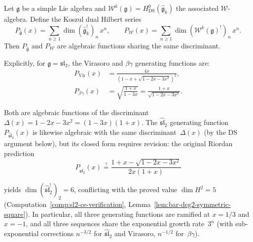 \begin{theorem}
\label{thm:ds-bar-gf-discriminant}
Let $\mathfrak{g}$ be a simple Lie algebra and
$\mathcal{W}^k(\mathfrak{g}) = H^0_{\mathrm{DS}}(\widehat{\mathfrak{g}}_k)$
the associated $\mathcal{W}$-algebra.
Define the Koszul dual Hilbert series
\[
P_{\widehat{\mathfrak{g}}}(x)
  = \sum_{n \geq 1} \dim (\widehat{\mathfrak{g}}_k^!)_n\, x^n,
\qquad
P_{\mathcal{W}}(x)
  = \sum_{n \geq 1} \dim (\mathcal{W}^k(\mathfrak{g})^!)_n\, x^n.
\]
Then $P_{\widehat{\mathfrak{g}}}$ and $P_{\mathcal{W}}$ are algebraic
functions sharing the same discriminant.

Explicitly, for $\mathfrak{g} = \mathfrak{sl}_2$,
the Virasoro and $\beta\gamma$ generating functions are:
\begin{align}
P_{\mathrm{Vir}}(x)
  &= \frac{4x}{(1 - x + \sqrt{1 - 2x - 3x^2})^2},
  \label{eq:gf-vir-motzkin} \\
P_{\beta\gamma}(x)
  &= \sqrt{\frac{1+x}{1-3x}}
  = \frac{1+x}{\sqrt{1-2x-3x^2}}.
  \label{eq:gf-betagamma}
\end{align}

Both are algebraic functions of the discriminant
$\Delta(x) = 1 - 2x - 3x^2 = (1-3x)(1+x)$.
The $\widehat{\mathfrak{sl}}_2$ generating function
$P_{\widehat{\mathfrak{sl}}_2}(x)$ is likewise algebraic with
the same discriminant~$\Delta(x)$ (by the DS argument below),
but its closed form requires revision: the original Riordan
prediction
\begin{equation}\label{eq:gf-sl2-riordan}
P_{\widehat{\mathfrak{sl}}_2}(x)
  \stackrel{?}{=} \frac{1 + x - \sqrt{1 - 2x - 3x^2}}{2x(1+x)}
\end{equation}

yields $\dim(\widehat{\mathfrak{sl}}_2^!)_2 = 6$, conflicting
with the proved value $\dim H^2 = 5$
(Computation~\ref{comp:sl2-ce-verification},
Lemma~\ref{lem:bar-deg2-symmetric-square}).
In particular, all three generating functions are ramified at
$x = 1/3$ and $x = -1$, and all three sequences share the
exponential growth rate~$3^n$
(with sub-exponential corrections $n^{-3/2}$ for
$\widehat{\mathfrak{sl}}_2$ and Virasoro,
$n^{-1/2}$ for~$\beta\gamma$).
\end{theorem}

